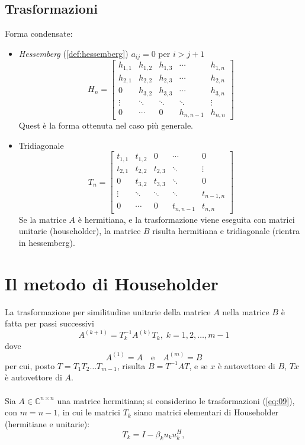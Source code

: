 \subsection{Trasformazioni}
Forma condensate:
\begin{itemize}
\item \emph{Hessemberg} (\ref{def:hessemberg})
  $ a_{ij} = 0$ per $i > j+1$
  $$
  H_n = \begin{bmatrix}
    h_{1,1} & h_{1,2} & h_{1,3} & \cdots    & h_{1,n} \\
    h_{2,1} & h_{2,2} & h_{2,3} & \cdots    & h_{2,n} \\
    0       & h_{3,2} & h_{3,3} & \cdots    & h_{3,n} \\
    \vdots  & \ddots  & \ddots  & \ddots    & \vdots  \\
    0       & \cdots  & 0       & h_{n,n-1} & h_{n,n}
  \end{bmatrix}
  $$
Quest è la forma ottenuta nel caso più generale.

\item Tridiagonale
  $$
  T_n = \begin{bmatrix}
    t_{1,1} & t_{1,2} & 0 & \cdots  & 0 \\
    t_{2,1} & t_{2,2} & t_{2,3} & \ddots  & \vdots  \\
    0       & t_{3,2} & t_{3,3} & \ddots  & 0 \\
    \vdots  & \ddots  & \ddots  & \ddots  & t_{n-1,n}  \\
    0       & \cdots  & 0     & t_{n,n-1} & t_{n,n}
  \end{bmatrix}
  $$
Se la matrice $A$ è hermitiana, e la trasformazione viene eseguita con
matrici unitarie (householder), la matrice $B$ risulta hermitiana e
tridiagonale (rientra in hessemberg).
\end{itemize}

\section{Il metodo di Householder}
La trasformazione per similitudine unitarie della matrice $A$ nella matrice $B$
\`e fatta per passi successivi
\begin{equation}
  \label{eq:09}
  A^{(k+1)} = T^{-1}_k A^{(k)} T_k,\;  k = 1, 2, \ldots , m-1
\end{equation}
dove
$$ A^{(1)}=A \quad \text{e} \quad A^{(m)}=B$$
per cui, posto $T = T_1 T_2 \ldots T_{m-1}$, risulta $B = T^{-1} AT$,
e se $x$ \`e autovettore  di $B$, $T x$ \`e autovettore di $A$.
\\ \\
Sia $A \in \mathbb{C}^{n \times n}$ una matrice hermitiana;
si considerino le trasformazioni (\ref{eq:09}), con $m = n-1$,
in cui le matrici $T_k$ siano matrici elementari di Householder
(hermitiane e unitarie):
$$T_k= I − \beta_k u_k u_k^{H} ,$$


